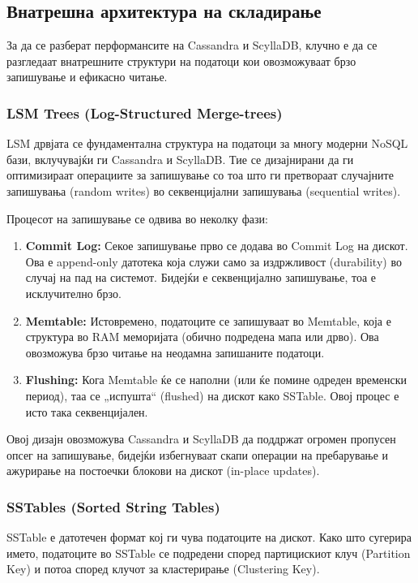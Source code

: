 \subsection{Внатрешна архитектура на складирање}
За да се разберат перформансите на Cassandra и ScyllaDB, клучно е да се разгледаат внатрешните структури 
на податоци кои овозможуваат брзо запишување и ефикасно читање.

\subsubsection{LSM Trees (Log-Structured Merge-trees)}
LSM дрвјата се фундаментална структура на податоци за многу модерни NoSQL бази, вклучувајќи ги Cassandra 
и ScyllaDB. Тие се дизајнирани да ги оптимизираат операциите за запишување со тоа што ги претвораат 
случајните запишувања (random writes) во секвенцијални запишувања (sequential writes).

Процесот на запишување се одвива во неколку фази:
\begin{enumerate}
    \item \textbf{Commit Log:} Секое запишување прво се додава во Commit Log на дискот. Ова е append-only 
    датотека која служи само за издржливост (durability) во случај на пад на системот. Бидејќи е 
    секвенцијално запишување, тоа е исклучително брзо.
    \item \textbf{Memtable:} Истовремено, податоците се запишуваат во Memtable, која е структура во RAM 
    меморијата (обично подредена мапа или дрво). Ова овозможува брзо читање на неодамна запишаните податоци.
    \item \textbf{Flushing:} Кога Memtable ќе се наполни (или ќе помине одреден временски период), таа се 
    „испушта“ (flushed) на дискот како SSTable. Овој процес е исто така секвенцијален.
\end{enumerate}

Овој дизајн овозможува Cassandra и ScyllaDB да поддржат огромен пропусен опсег на запишување, бидејќи 
избегнуваат скапи операции на пребарување и ажурирање на постоечки блокови на дискот (in-place updates).

\subsubsection{SSTables (Sorted String Tables)}
SSTable е датотечен формат кој ги чува податоците на дискот. Како што сугерира името, податоците во 
SSTable се подредени според партицискиот клуч (Partition Key) и потоа според клучот за кластерирање 
(Clustering Key).

